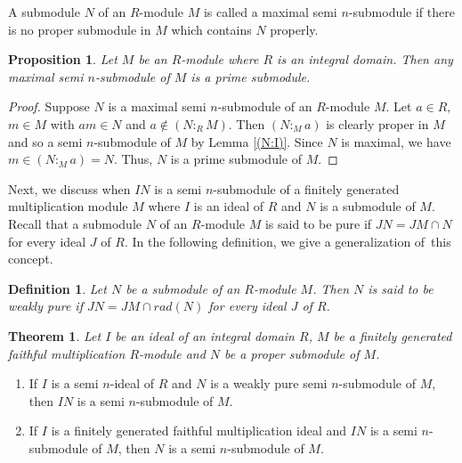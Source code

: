 \documentclass{amsart}%
\newtheorem{theorem}{Theorem}
\theoremstyle{plain}
\newtheorem{definition}{Definition}
\newtheorem{proposition}{Proposition}
\numberwithin{equation}{section}
\begin{document}
A submodule $N$ of an $R$-module $M$ is called a maximal semi $n$-submodule if
there is no proper submodule in $M$ which contains $N$ properly.

\begin{proposition}
Let $M$ be an $R$-module where $R$ is an integral domain. Then any maximal
semi $n$-submodule of $M$ is a prime submodule.
\end{proposition}

\begin{proof}
Suppose $N$ is a maximal semi $n$-submodule of an $R$-module $M$. Let $a\in
R,$ $m\in M$ with $am\in N$ and $a\notin(N:_{R}M).$ Then $(N:_{M}a)$ is
clearly proper in $M$ and so a semi $n$-submodule of $M$ by Lemma \ref{(N:I)}.
Since $N$ is maximal, we have $m\in(N:_{M}a)=N$. Thus, $N$ is a prime
submodule of $M.$
\end{proof}

Next, we discuss when $IN$ is a semi $n$-submodule of a finitely generated
multiplication module $M$ where $I$ is an ideal of $R$ and $N$ is a submodule
of $M$. Recall that a submodule $N$ of an $R$-module $M$ is said to be pure if
$JN=JM\cap N$ for every ideal $J$ of $R$. In the following definition, we give
a generalization of\ this concept.

\begin{definition}
Let $N$ be a submodule of an $R$-module $M$. Then $N$ is said to be weakly
pure if $JN=JM\cap rad(N)$ for every ideal $J$ of $R$.
\end{definition}

\begin{theorem}
\label{IN}Let $I$ be an ideal of an integral domain $R$, $M$ be a finitely
generated faithful multiplication $R$-module and $N$ be a proper submodule of
$M$.
\end{theorem}

\begin{enumerate}
\item If $I$ is a semi $n$-ideal of $R$ and $N$ is a weakly pure semi
$n$-submodule of $M$, then $IN$ is a semi $n$-submodule of $M$.

\item If $I$ is a finitely generated faithful multiplication ideal and $IN$ is
a semi $n$-submodule of $M$, then $N$ is a semi $n$-submodule of $M$.
\end{enumerate}
\end{document}
